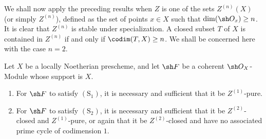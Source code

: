 \begin{env}[5.10.13]
\label{IV.5.10.13}
We shall now apply the preceding results when $Z$ is one of the
sets $Z^{(n)}(X)$ (or simply $Z^{(n)}$), defined as the set of
points $x\in X$ such that $\dim(\sh O_x)\geq n$.
It is clear that $Z^{(n)}$ is stable under specialization.  A
closed subset $T$ of $X$ is contained in $Z^{(n)}$ if and only if $\codim(T,X)\geq n$.
We shall be concerned here with the case $n=2$.
\end{env}

\begin{proposition}[5.10.14]
\label{IV.5.10.14}
Let $X$ be a locally Noetherian prescheme, and let $\sh F$ be a
coherent $\sh O_X$-Module whose support is $X$.
\begin{enumerate}[{\rm(i)}]
  \item For $\sh F$ to satisfy $(\mathrm S_1)$, it is necessary and
  sufficient that it be $Z^{(1)}$-pure.
  \item For $\sh F$ to satisfy $(\mathrm S_2)$, it is necessary and
  sufficient that it be $Z^{(2)}$-closed and $Z^{(1)}$-pure, or again
  that it be $Z^{(2)}$-closed and have no associated prime cycle of
  codimension $1$.
\end{enumerate}
\end{proposition}


